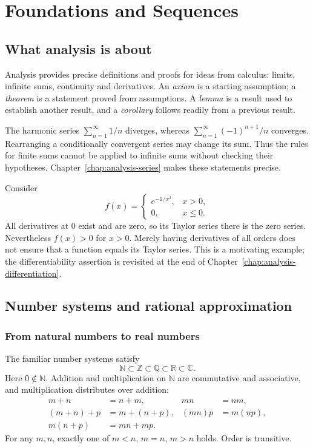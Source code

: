 \chapter{Foundations and Sequences}\label{chap:analysis-foundations}

\section{What analysis is about}
Analysis provides precise definitions and proofs for ideas from calculus:
limits, infinite sums, continuity and derivatives. An \emph{axiom} is a
starting assumption; a \emph{theorem} is a statement proved from assumptions.
A \emph{lemma} is a result used to establish another result, and a
\emph{corollary} follows readily from a previous result.

\begin{example}
The harmonic series $\sum_{n=1}^{\infty}1/n$ diverges, whereas
$\sum_{n=1}^{\infty}(-1)^{n+1}/n$ converges. Rearranging a conditionally
convergent series may change its sum. Thus the rules for finite sums cannot
be applied to infinite sums without checking their hypotheses.
Chapter~\ref{chap:analysis-series} makes these statements precise.
\end{example}

\begin{example}
Consider
\[
f(x)=\begin{cases}e^{-1/x^2},&x>0,\\0,&x\leq0.\end{cases}
\]
All derivatives at $0$ exist and are zero, so its Taylor series there is the
zero series. Nevertheless $f(x)>0$ for $x>0$. Merely having derivatives of
all orders does not ensure that a function equals its Taylor series.
This is a motivating example; the differentiability assertion is revisited
at the end of Chapter~\ref{chap:analysis-differentiation}.
\end{example}

\section{Number systems and rational approximation}
\subsection{From natural numbers to real numbers}
The familiar number systems satisfy
\[
\mathbb N\subset\mathbb Z\subset\mathbb Q\subset\mathbb R\subset\mathbb C.
\]
Here $0\notin\mathbb N$. Addition and multiplication on $\mathbb N$ are
commutative and associative, and multiplication distributes over addition:
\begin{align*}
m+n&=n+m,&mn&=nm,\\
(m+n)+p&=m+(n+p),&(mn)p&=m(np),\\
m(n+p)&=mn+mp.
\end{align*}
For any $m,n$, exactly one of $m<n$, $m=n$, $m>n$ holds. Order is transitive.

